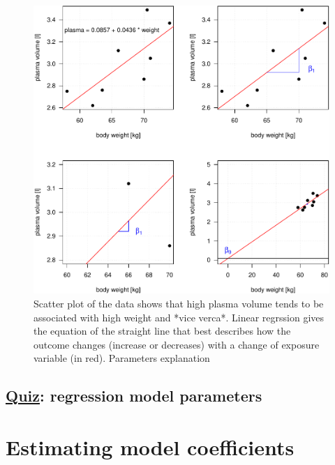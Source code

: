 \documentclass[]{article}
\begin{document}
\begin{figure}[H]

{\centering \includegraphics{session-regression-I-files/figures/fig-intro-example-reg-parameters-1} 

}

\caption{Scatter plot of the data shows that high plasma volume tends to be associated with high weight and *vice verca*. Linear regrssion gives the equation of the straight line that best describes how the outcome changes (increase or decreases) with a change of exposure variable (in red). Parameters explanation}\label{fig:fig-intro-example-reg-parameters}
\end{figure}

\hypertarget{quiz-regression-model-parameters}{%
\subsection{\texorpdfstring{\href{https://forms.gle/8jSsdQehGhjw87E38}{Quiz}:
regression model
parameters}{Quiz: regression model parameters}}\label{quiz-regression-model-parameters}}

\newpage

\hypertarget{estimating-model-coefficients}{%
\section{Estimating model
coefficients}\label{estimating-model-coefficients}}
\end{document}
